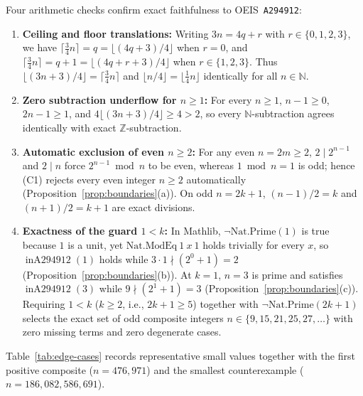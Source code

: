 \documentclass[11pt]{article}
\theoremstyle{definition}
\newcommand{\N}{\mathbb{N}}
\newcommand{\Z}{\mathbb{Z}}
\newcommand{\seq}[1]{\texttt{#1}}
\newcommand{\inA}{\operatorname{inA294912}}
\begin{document}
Four arithmetic checks confirm exact faithfulness to OEIS~\seq{A294912}:
\begin{enumerate}
\item \textbf{Ceiling and floor translations:} Writing $3n = 4q + r$ with $r \in \{0, 1, 2, 3\}$, we have $\lceil \frac{3}{4}n \rceil = q = \lfloor (4q + 3)/4 \rfloor$ when $r = 0$, and $\lceil \frac{3}{4}n \rceil = q + 1 = \lfloor (4q + r + 3)/4 \rfloor$ when $r \in \{1, 2, 3\}$. Thus $\lfloor(3n + 3)/4\rfloor = \lceil \frac{3}{4}n \rceil$ and $\lfloor n/4 \rfloor = \lfloor \frac{1}{4}n \rfloor$ identically for all $n \in \N$.
\item \textbf{Zero subtraction underflow for $n \ge 1$:} For every $n \ge 1$, $n - 1 \ge 0$, $2n - 1 \ge 1$, and $4\lfloor(3n+3)/4\rfloor \ge 4 > 2$, so every $\N$-subtraction agrees identically with exact $\Z$-subtraction.
\item \textbf{Automatic exclusion of even $n \ge 2$:} For any even $n = 2m \ge 2$, $2 \mid 2^{n-1}$ and $2 \mid n$ force $2^{n-1} \bmod n$ to be even, whereas $1 \bmod n = 1$ is odd; hence (C1) rejects every even integer $n \ge 2$ automatically (Proposition~\ref{prop:boundaries}(a)). On odd $n = 2k + 1$, $(n-1)/2 = k$ and $(n+1)/2 = k + 1$ are exact divisions.
\item \textbf{Exactness of the guard $1 < k$:} In Mathlib, $\neg\mathrm{Nat.Prime}(1)$ is true because $1$ is a unit, yet $\mathrm{Nat.ModEq}\ 1\ x\ 1$ holds trivially for every $x$, so $\inA(1)$ holds while $3 \cdot 1 \nmid (2^0 + 1) = 2$ (Proposition~\ref{prop:boundaries}(b)). At $k = 1$, $n = 3$ is prime and satisfies $\inA(3)$ while $9 \nmid (2^1 + 1) = 3$ (Proposition~\ref{prop:boundaries}(c)). Requiring $1 < k$ ($k \ge 2$, i.e., $2k + 1 \ge 5$) together with $\neg\mathrm{Nat.Prime}(2k + 1)$ selects the exact set of odd composite integers $n \in \{9, 15, 21, 25, 27, \dots\}$ with zero missing terms and zero degenerate cases.
\end{enumerate}

Table~\ref{tab:edge-cases} records representative small values together with the first positive composite ($n = 476{,}971$) and the smallest counterexample ($n = 186{,}082{,}586{,}691$).
\end{document}

